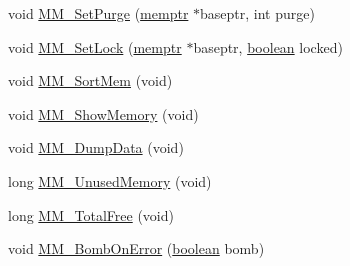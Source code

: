 \begin{DoxyCompactItemize}
\item 
void \hyperlink{ID__MM_8C_a114de4a52bcc47e8d668ab78a7c702c9}{MM\_\-SetPurge} (\hyperlink{ID__MM_8H_a04062decc7eb282b066c65e9137bb9bf}{memptr} $\ast$baseptr, int purge)
\item 
void \hyperlink{ID__MM_8C_acbec6e3295a580e1067bbd69ea89d275}{MM\_\-SetLock} (\hyperlink{ID__MM_8H_a04062decc7eb282b066c65e9137bb9bf}{memptr} $\ast$baseptr, \hyperlink{ID__HEAD_8H_a7c6368b321bd9acd0149b030bb8275ed}{boolean} locked)
\item 
void \hyperlink{ID__MM_8C_a1ab3355666068dc56c6d591354b17a3e}{MM\_\-SortMem} (void)
\item 
void \hyperlink{ID__MM_8C_ac00e670ca581737e0e534b94959b5dbf}{MM\_\-ShowMemory} (void)
\item 
void \hyperlink{ID__MM_8C_a5bcc193971082edd803319a5e107b54c}{MM\_\-DumpData} (void)
\item 
long \hyperlink{ID__MM_8C_aa26a7b3f7516bf637f814c67b4791800}{MM\_\-UnusedMemory} (void)
\item 
long \hyperlink{ID__MM_8C_a50561a6be4f4de9e6c017fc231d3e2a9}{MM\_\-TotalFree} (void)
\item 
void \hyperlink{ID__MM_8C_aec67dba21150a6028caa41540d8575ca}{MM\_\-BombOnError} (\hyperlink{ID__HEAD_8H_a7c6368b321bd9acd0149b030bb8275ed}{boolean} bomb)
\end{DoxyCompactItemize}
